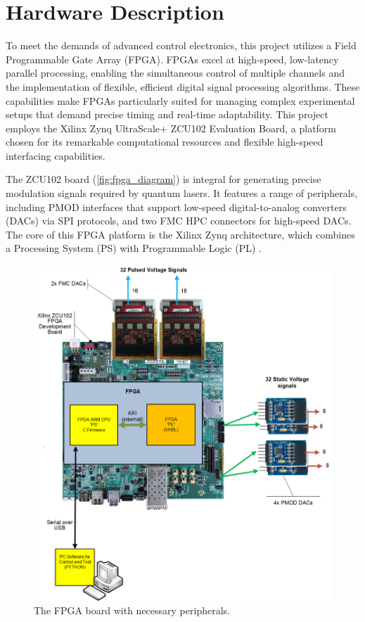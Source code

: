 \section{Hardware Description}\label{sec:bg_hw}

To meet the demands of advanced control electronics, this project utilizes a Field Programmable Gate Array (FPGA). FPGAs excel at high-speed, low-latency parallel processing, enabling the simultaneous control of multiple channels and the implementation of flexible, efficient digital signal processing algorithms. These capabilities make FPGAs particularly suited for managing complex experimental setups that demand precise timing and real-time adaptability. This project employs the Xilinx Zynq UltraScale+ ZCU102 Evaluation Board, a platform chosen for its remarkable computational resources and flexible high-speed interfacing capabilities.

The ZCU102 board (\autoref{fig:fpga_diagram}) is integral for generating precise modulation signals required by quantum lasers. It features a range of peripherals, including PMOD interfaces that support low-speed digital-to-analog converters (DACs) via SPI protocols, and two FMC HPC connectors for high-speed DACs. The core of this FPGA platform is the Xilinx Zynq architecture, which combines a Processing System (PS) with Programmable Logic (PL) \cite{XilinxUG1182}.

\begin{figure}[ht]
    \centering
    \includegraphics[width=0.80\linewidth]{figures/board.png}
    \caption{The FPGA board with necessary peripherals.}
    \label{fig:fpga_diagram}
\end{figure}

